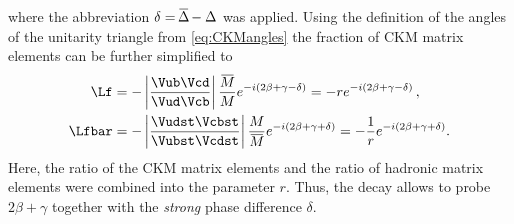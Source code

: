 where the abbreviation $\delta=\overline{\kern -1.0pt \Delta\kern -1.0pt}-\Delta$ was applied.
Using the definition of the angles of the unitarity triangle from \cref{eq:CKMangles} the fraction of CKM matrix elements can be further simplified to
\begin{align}
\Lf&=-\left|\frac{\Vub\Vcd}{\Vud\Vcb}\right|\frac{\overline{\kern -1.0pt M\kern -1.0pt}}{M}e^{-i\left(2\beta+\gamma-\delta\right)}=-re^{-i\left(2\beta+\gamma-\delta\right)}\,,\\
\Lfbar&=-\left|\frac{\Vudst\Vcbst}{\Vubst\Vcdst}\right|\frac{M}{\overline{\kern -1.0pt M\kern -1.0pt}}e^{-i\left(2\beta+\gamma+\delta\right)}=-\frac{1}{r}e^{-i\left(2\beta+\gamma+\delta\right)}.
\end{align}
Here, the ratio of the CKM matrix elements and the ratio of hadronic matrix elements were combined into the parameter $r$.
Thus, the decay allows to probe $2\beta+\gamma$ together with the \emph{strong} phase difference $\delta$.

